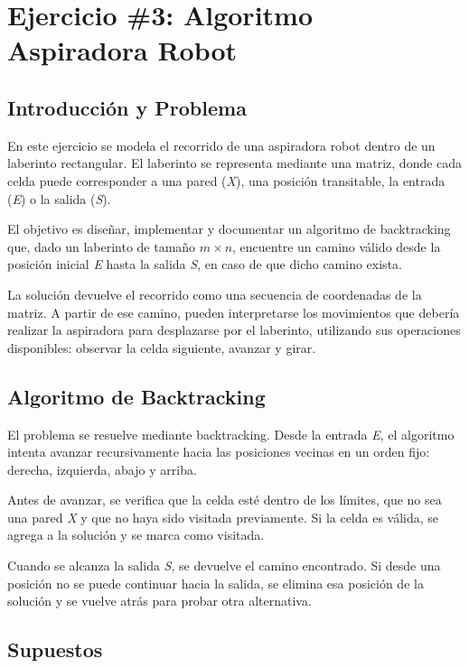 \section{Ejercicio \#3: Algoritmo Aspiradora Robot}

\subsection{Introducción y Problema}

En este ejercicio se modela el recorrido de una aspiradora robot dentro de un laberinto rectangular. El laberinto se representa mediante una matriz,
donde cada celda puede corresponder a una pared (\textit{X}), una posición transitable, la entrada (\textit{E}) o la salida (\textit{S}).

El objetivo es diseñar, implementar y documentar un algoritmo de backtracking que, dado un laberinto de tamaño $m \times n$, encuentre un camino
válido desde la posición inicial \textit{E} hasta la salida \textit{S}, en caso de que dicho camino exista.

La solución devuelve el recorrido como una secuencia de coordenadas de la matriz. A partir de ese camino, pueden interpretarse
los movimientos que debería realizar la aspiradora para desplazarse por el laberinto, utilizando sus operaciones disponibles:
observar la celda siguiente, avanzar y girar.

\subsection{Algoritmo de Backtracking}

El problema se resuelve mediante backtracking. Desde la entrada \textit{E}, el algoritmo intenta avanzar recursivamente hacia las posiciones vecinas en un orden fijo: derecha, izquierda, abajo y arriba.

Antes de avanzar, se verifica que la celda esté dentro de los límites, que no sea una pared \textit{X} y que no haya sido visitada previamente. Si la celda es válida, se agrega a la solución y se marca como visitada.

Cuando se alcanza la salida \textit{S}, se devuelve el camino encontrado. Si desde una posición no se puede continuar hacia la salida, se elimina esa posición de la solución y se vuelve atrás para probar otra alternativa.

\subsection{Supuestos}

